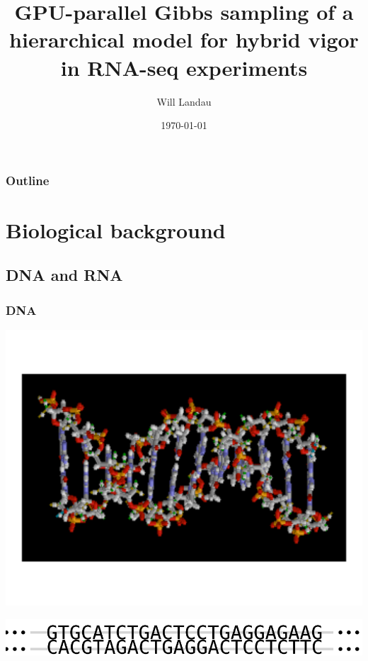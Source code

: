 \documentclass[handout]{beamer}
\title{GPU-parallel Gibbs sampling of a hierarchical model for hybrid vigor in RNA-seq experiments}
\author{Will Landau}
\date{\today}
\institute{Iowa State University}
\numberwithin{equation}{section}
\begin{document}
\begin{frame}
\titlepage
 \end{frame}
 
\begin{frame}
\frametitle{Outline}
\tableofcontents
\end{frame}


\section{Biological background}

\subsection{DNA and RNA}


\begin{frame}
\frametitle{DNA}
\begin{center}
\includegraphics[scale=.23]{fig/dna-img}
\end{center}
\begin{center}
\includegraphics[scale=.23]{fig/dna.png}
\end{center}
\end{frame}
\end{document}
